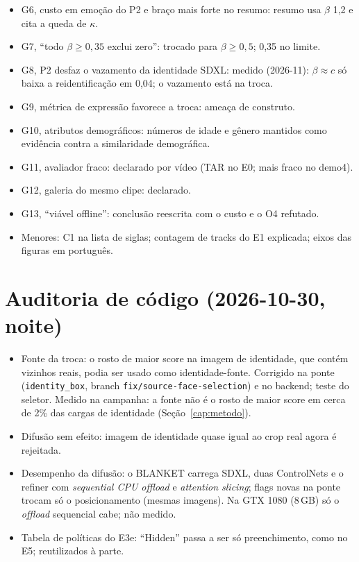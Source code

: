 \begin{itemize}
\item G6, custo em emoção do P2 e braço mais forte no resumo: resumo usa $\beta$ 1,2 e cita a queda de $\kappa$.
\item G7, ``todo $\beta \ge 0{,}35$ exclui zero'': trocado para $\beta \ge 0{,}5$; 0,35 no limite.
\item G8, P2 desfaz o vazamento da identidade SDXL: medido (2026-11): $\beta \approx c$ só baixa a reidentificação em 0,04; o vazamento está na troca.
\item G9, métrica de expressão favorece a troca: ameaça de construto.
\item G10, atributos demográficos: números de idade e gênero mantidos como evidência contra a similaridade demográfica.
\item G11, avaliador fraco: declarado por vídeo (TAR no E0; mais fraco no demo4).
\item G12, galeria do mesmo clipe: declarado.
\item G13, ``viável offline'': conclusão reescrita com o custo e o O4 refutado.
\item Menores: C1 na lista de siglas; contagem de tracks do E1 explicada; eixos das figuras em português.
\end{itemize}

\section{Auditoria de código (2026-10-30, noite)}
\begin{itemize}
\item Fonte da troca: o rosto de maior score na imagem de identidade, que contém vizinhos reais, podia ser usado como identidade-fonte. Corrigido na ponte (\texttt{identity\_box}, branch \texttt{fix/source-face-selection}) e no backend; teste do seletor. Medido na campanha: a fonte não é o rosto de maior score em cerca de 2\% das cargas de identidade (Seção~\ref{cap:metodo}).
\item Difusão sem efeito: imagem de identidade quase igual ao crop real agora é rejeitada.
\item Desempenho da difusão: o BLANKET carrega SDXL, duas ControlNets e o refiner com \emph{sequential CPU offload} e \emph{attention slicing}; flags novas na ponte trocam só o posicionamento (mesmas imagens). Na GTX 1080 (8\,GB) só o \emph{offload} sequencial cabe; não medido.
\item Tabela de políticas do E3e: ``Hidden'' passa a ser só preenchimento, como no E5; reutilizados à parte.
\end{itemize}
